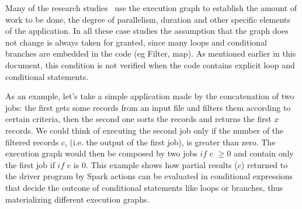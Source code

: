 Many of the research studies~\cite{gibilisco2016stage,Sidhanta2016, dSpark, nfm} use the execution graph to establish the amount of work to be done, the degree of parallelism, duration and other specific elements of the application. In all these case studies the assumption that the graph does not change is always taken for granted, since many loops and conditional branches are embedded in the code (eg Filter, map). As mentioned earlier in this document, this condition is not verified when the code contains explicit loop and conditional statements.


As an example, let's take a simple application made by the concatenation of two jobs: the first  gets some records from an input file and filters them according to certain criteria, then the  second one sorts the records and returns the first $x$ records. We could think of executing the second job only if the number of the filtered records $c$, (i.e. the output of the first job), is greater than zero. The execution graph would then be composed by two jobs $if$ c $\geq 0$ and contain only the first job if  $if$ c is $0$. This example shows how partial results ($c$)  returned to the driver program by Spark actions can be evaluated in conditional expressions that decide the outcone of conditional statements like loops or branches, thus materializing different execution graphs.

